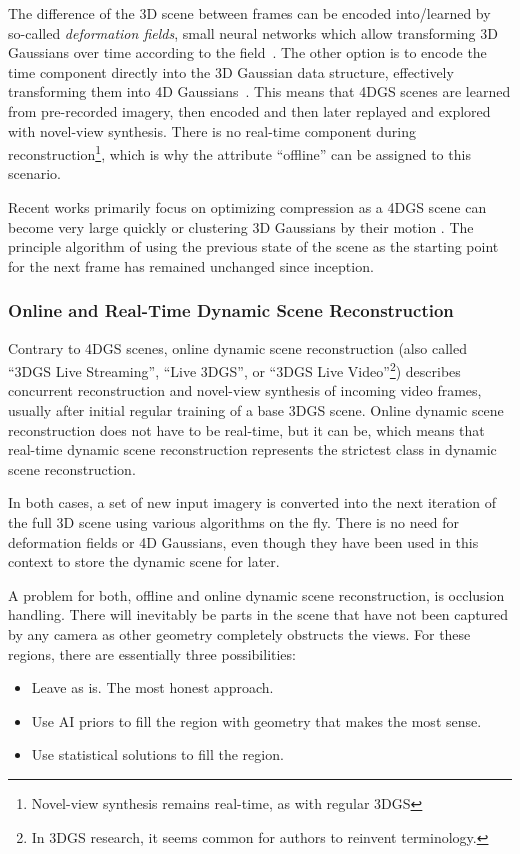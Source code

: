 The difference of the 3D scene between frames can be encoded into/learned by so-called \textit{deformation fields}, small neural networks which allow transforming 3D Gaussians over time according to the field~\cite{wu4DGaussianSplatting2024}. The other option is to encode the time component directly into the 3D Gaussian data structure, effectively transforming them into 4D Gaussians~\cite{yangRealtimePhotorealisticDynamic2024}.
This means that 4DGS scenes are learned from pre-recorded imagery, then encoded and then later replayed and explored with novel-view synthesis.
There is no real-time component during reconstruction\footnote{Novel-view synthesis remains real-time, as with regular 3DGS}, which is why the attribute \enquote{offline} can be assigned to this scenario.

Recent works primarily focus on optimizing compression as a 4DGS scene can become very large quickly \cite{lee2025optimizedminimal4dgaussian} or clustering 3D Gaussians by their motion \cite{NEURIPS2025_b690b88d}. The principle algorithm of using the previous state of the scene as the starting point for the next frame has remained unchanged since inception.

\subsubsection{Online and Real-Time Dynamic Scene Reconstruction}
Contrary to 4DGS scenes, online dynamic scene reconstruction (also called \enquote{3DGS Live Streaming}, \enquote{Live 3DGS}, or \enquote{3DGS Live Video}\footnote{In 3DGS research, it seems common for authors to reinvent terminology.}) describes concurrent reconstruction and novel-view synthesis of incoming video frames, usually after initial regular training of a base 3DGS scene.
Online dynamic scene reconstruction does not have to be real-time, but it can be, which means that real-time dynamic scene reconstruction represents the strictest class in dynamic scene reconstruction.

In both cases, a set of new input imagery is converted into the next iteration of the full 3D scene using various algorithms on the fly. There is no need for deformation fields or 4D Gaussians, even though they have been used in this context to store the dynamic scene for later.

A problem for both, offline and online dynamic scene reconstruction, is occlusion handling. There will inevitably be parts in the scene that have not been captured by any camera as other geometry completely obstructs the views. For these regions, there are essentially three possibilities:
\begin{itemize}
\item Leave as is. The most honest approach.
\item Use AI priors to fill the region with geometry that makes the most sense.
\item Use statistical solutions to fill the region.
\end{itemize}

